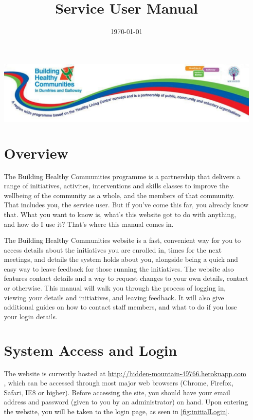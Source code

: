 \documentclass{bhcguides}
\begin{document}
\title{Service User Manual}
\includegraphics[width=1.0\textwidth]{BHCbanner.png}
\date{\today}
\maketitle

\tableofcontents

\section{Overview}

The Building Healthy Communities programme is a partnership that delivers a range of initiatives, activites, interventions and skills classes to improve the wellbeing of the community as a whole, and the members of that community. That includes you, the service user. But if you've come this far, you already know that. What you want to know is, what's this website got to do with anything, and how do I use it? That's where this manual comes in.

The Building Healthy Communities website is a fast, convenient way for you to access details about the initiatives you are enrolled in, times for the next meetings, and details the system holds about you, alongside being a quick and easy way to leave feedback for those running the initiatives. The website also features contact details and a way to request changes to your own details, contact or otherwise. This manual will walk you through the process of logging in, viewing your details and initiatives, and leaving feedback. It will also give additional guides on how to contact staff members, and what to do if you lose your login details.

\pagebreak

\section{System Access and Login}
\label{sec:syslogin}

The website is currently hosted at \url{http://hidden-mountain-49766.herokuapp.com} , which can be accessed through most major web browsers (Chrome, Firefox, Safari, IE8 or higher). Before accessing the site, you should have your email address and password (given to you by an administrator) on hand. Upon entering the website, you will be taken to the login page, as seen in \autoref{fig:initialLogin}.
\end{document}
